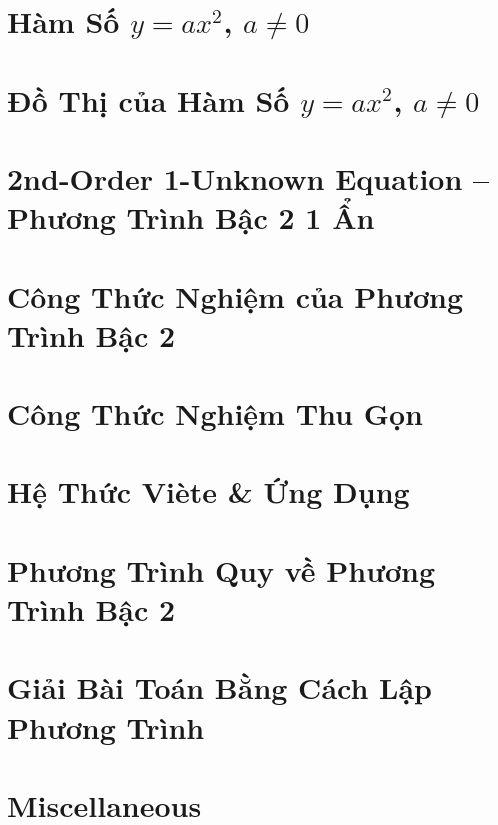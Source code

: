 \documentclass{article}
\begin{document}
\section{Hàm Số $y = ax^2$, $a\ne0$}


\section{Đồ Thị của Hàm Số $y = ax^2$, $a\ne0$}


\section{2nd-Order 1-Unknown Equation -- Phương Trình Bậc 2 1 Ẩn}


\section{Công Thức Nghiệm của Phương Trình Bậc 2}


\section{Công Thức Nghiệm Thu Gọn}


\section{Hệ Thức Vi\`ete \& Ứng Dụng}


\section{Phương Trình Quy về Phương Trình Bậc 2}


\section{Giải Bài Toán Bằng Cách Lập Phương Trình}


\section{Miscellaneous}


\printbibliography[heading=bibintoc]
	
\end{document}
